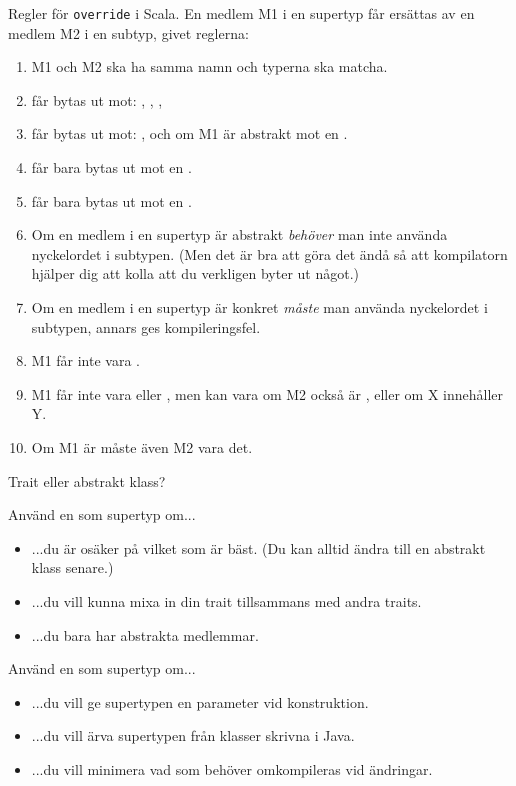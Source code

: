 \begin{Slide}{Regler för \texttt{override} i Scala.} \SlideFontTiny
\label{slideW07:overriderules}
En medlem M1 i en supertyp får ersättas av en medlem M2 i en subtyp, givet reglerna:
\begin{enumerate}
\item M1 och M2 ska ha samma namn och typerna ska matcha.
\item {} får bytas ut mot: , , , 
\item {} får bytas ut mot: , och om M1 är abstrakt mot en .
\item {} får bara bytas ut mot en .
\item {} får bara bytas ut mot en .
\item Om en medlem i en supertyp är abstrakt \emph{behöver} man inte använda nyckelordet  i subtypen. (Men det är bra att göra det ändå så att kompilatorn hjälper dig att kolla att du verkligen byter ut något.) 
\item Om en medlem i en supertyp är konkret \emph{måste} man använda nyckelordet  i subtypen, annars ges kompileringsfel.
\item M1 får inte vara .
\item M1 får inte vara  eller , men kan vara  om M2 också är , eller  om X innehåller Y.   
\item Om M1 är  måste även M2 vara det.

\end{enumerate}
\end{Slide}


\begin{Slide}{Trait eller abstrakt klass?} 
\SlideFontSmall
\label{slideW07:traitorclass}
\begin{multicols}{2}
Använd en  som supertyp om...
\begin{itemize}
\item ...du är osäker på vilket som är bäst. (Du kan alltid ändra till en abstrakt klass senare.)
\item ...du vill kunna mixa in din trait tillsammans med andra traits.
\item ...du bara har abstrakta medlemmar. 
\end{itemize}

\columnbreak

Använd en  som supertyp om...
\begin{itemize}
\item ...du vill ge supertypen en parameter vid konstruktion.
\item ...du vill ärva supertypen från klasser skrivna i Java.
\item ...du vill minimera vad som behöver omkompileras vid ändringar. 
\end{itemize}


\end{multicols}
\end{Slide}



